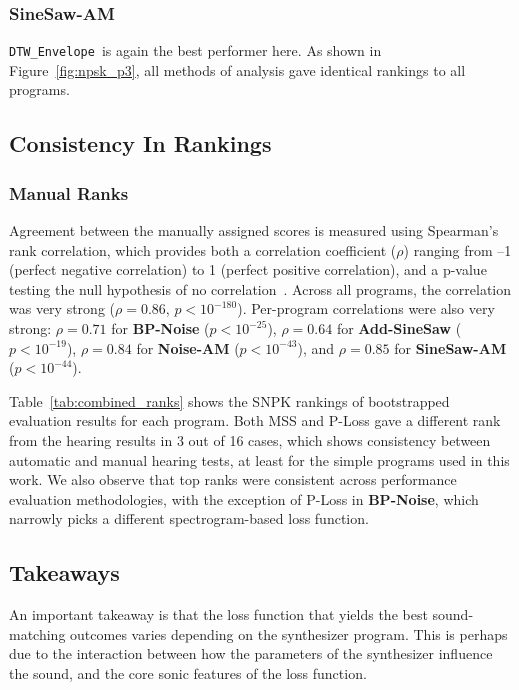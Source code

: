 \documentclass[lettersize,journal]{IEEEtran}
\newcommand{\DTWEnv}{\texttt{DTW\_Envelope}}
\newcommand{\BPNoise}{\textbf{BP-Noise}}
\newcommand{\AddSineSaw}{\textbf{Add-SineSaw}}
\newcommand{\AmpMod}{\textbf{Noise-AM}}
\newcommand{\FMMod}{\textbf{SineSaw-AM}}
\begin{document}
\subsubsection{\FMMod}
\DTWEnv~is again the best performer here. As shown in Figure~\ref{fig:npsk_p3}, all methods of analysis gave identical rankings to all programs.

\subsection{Consistency In Rankings}
\label{sec:consistency_in_rankings}
\subsubsection{Manual Ranks} Agreement between the manually assigned scores is measured using Spearman’s rank correlation, which provides both a correlation coefficient ($\rho$) ranging from –1 (perfect negative correlation) to 1 (perfect positive correlation), and a p-value testing the null hypothesis of no correlation~\cite{spearman1987proof,rebekic2015pearson}. Across all programs, the correlation was very strong ($\rho = 0.86$, $p < 10^{-180}$). Per-program correlations were also very strong: $\rho = 0.71$ for \BPNoise{} ($p < 10^{-25}$), $\rho = 0.64$ for \AddSineSaw{} ($p < 10^{-19}$), $\rho = 0.84$ for \AmpMod{} ($p < 10^{-43}$), and $\rho = 0.85$ for \FMMod{} ($p < 10^{-44}$). 

Table~\ref{tab:combined_ranks} shows the SNPK rankings of bootstrapped evaluation results for each program. Both MSS and P-Loss gave a different rank from the hearing results in 3 out of 16 cases, which shows consistency between automatic and manual hearing tests, at least for the simple programs used in this work. We also observe that top ranks were consistent across performance evaluation methodologies, with the exception of P-Loss in \BPNoise, which narrowly picks a different spectrogram-based loss function.
% 


\subsection{Takeaways}
An important takeaway is that the loss function that yields the best sound-matching outcomes varies depending on the synthesizer program. This is perhaps due to the interaction between how the parameters of the synthesizer influence the sound, and the core sonic features of the loss function.
\end{document}
